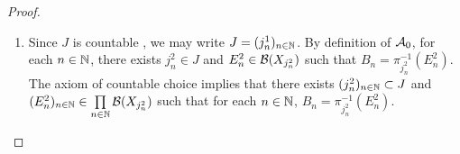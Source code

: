 \documentclass{book}
\begin{document}
\begin{proof}
\begin{enumerate}
\begin{align*}
				& = \pi_{j_1, j_0}^{-1}(E_1) \cap \pi_{j_2, j_0}^{-1}(E_2).
			\end{align*}
			We note that 
			\begin{align*}
				A_1 \cup A_2
				& = \pi_{j_1}^{-1}(E_1) \cup \pi_{j_2}^{-1}(E_2) \\
				& = (\pi_{j_1, j_0} \circ \pi_{j_0})^{-1}(E_1) \cup  (\pi_{j_2, j_0} \circ \pi_{j_0})^{-1}(E_2) \\
				& = \pi_{j_0}^{-1}(\pi_{j_1, j_0}^{-1}(E_1)) \cup \pi_{j_0}^{-1}(\pi_{j_2, j_0}^{-1}(E_2)) \\
				& = \pi_{j_0}^{-1}(\pi_{j_1, j_0}^{-1}(E_1) \cup \pi_{j_2, j_0}^{-1}(E_2)).
			\end{align*}
			Since $\mu_{j_0}$ is a complex measure and $\pi_{j_1, j_0}^{-1}(E_1) \cap \pi_{j_2, j_0}^{-1}(E_2) = \varnothing$, we have that 
			\begin{align*}
				\mu_0(A_1 \cup A_2) 
				& = \mu_0(\pi_{j_0}^{-1}(\pi_{j_1, j_0}^{-1}(E_1) \cup \pi_{j_2, j_0}^{-1}(E_2))) \\
				& = \mu_{j_0}(\pi_{j_1, j_0}^{-1}(E_1) \cup \pi_{j_2, j_0}^{-1}(E_2)) \\
				& = \mu_{j_0}(\pi_{j_1, j_0}^{-1}(E_1)) + \mu_{j_0}(\pi_{j_2, j_0}^{-1}(E_2)) \\
				& = \mu_0(\pi_{j_0}^{-1}(\pi_{j_1, j_0}^{-1}(E_1))) + \mu_0(\pi_{j_0}^{-1}(\pi_{j_2, j_0}^{-1}(E_2))) \\
				& = \mu_0((\pi_{j_1, j_0} \circ \pi_{j_0})^{-1}(E_1)) + \mu_0((\pi_{j_2, j_0} \circ \pi_{j_0})^{-1}(E_2)) \\
				& = \mu_0(\pi_{j_1}^{-1}(E_1)) + \mu_0(\pi_{j_2}^{-1}(E_2)) \\
				& = \mu_0(A_1) + \mu_0(A_2).
			\end{align*}
			Thus $\mu_0$ is finitely-additive. 
			\item Since $J$ is countable , we may write $J = (j^1_n)_{n \in \mathbb{N}}$. By definition of $\mathcal{A}_0$, for each $n \in \mathbb{N}$, there exists $j^2_n \in J$ and $E^2_n \in \mathcal{B}(X_{j^2_n})$ such that $B_n = \pi_{j^2_n}^{-1}(E^2_n)$. The axiom of countable choice implies that there exists $(j^2_n)_{n \in \mathbb{N}} \subset J$ and $(E_n^2)_{n \in \mathbb{N}} \in \prod\limits_{n \in \mathbb{N}} \mathcal{B}(X_{j^2_n})$ such that for each $n \in \mathbb{N}$, $B_n = \pi_{j^2_n}^{-1}(E^2_n)$. 
			

\end{enumerate}
\end{proof}
\end{document}
